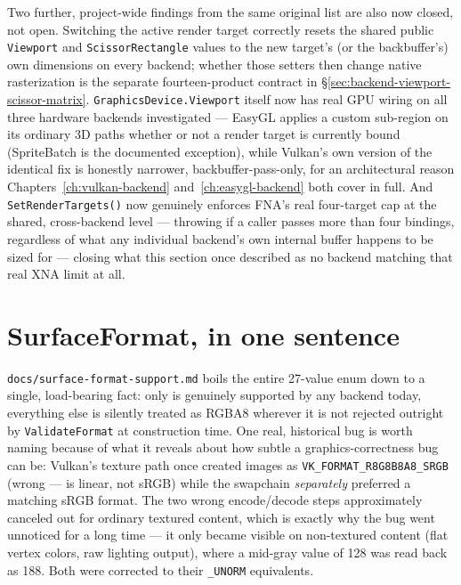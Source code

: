 Two further, project-wide findings from the same original list are also now closed, not open.
Switching the active render target correctly resets the shared public \texttt{Viewport} and
\texttt{Scissor\allowbreak{}Rectangle} values to the new target's (or the backbuffer's) own
dimensions on every backend; whether those setters then change native rasterization is the separate
fourteen-product contract in \S\ref{sec:backend-viewport-scissor-matrix}.
\texttt{GraphicsDevice.Viewport} itself now has real GPU wiring on all three
hardware backends investigated --- EasyGL applies a custom sub-region 
on its ordinary 3D paths whether or not a render target is currently bound (SpriteBatch is the
documented exception), while Vulkan's own version
of the identical fix is honestly narrower, backbuffer-pass-only, for an architectural reason
Chapters~\ref{ch:vulkan-backend} and~\ref{ch:easygl-backend} both cover in full. And
\texttt{SetRenderTargets()} now genuinely enforces FNA's real four-target cap at the shared,
cross-backend level --- throwing if a caller passes more than four bindings, regardless of
what any individual backend's own internal buffer happens to be sized for --- closing what
this section once described as no backend matching that real XNA limit at all.

\section{SurfaceFormat, in one sentence}

\texttt{docs/surface-format-support.md} boils the entire 27-value 
enum down to a single, load-bearing fact: only  is genuinely
supported by any backend today, everything else is silently treated as RGBA8 wherever it is
not rejected outright by \texttt{ValidateFormat} at construction time. One real, historical
bug is worth naming because of what it reveals about how subtle a graphics-correctness bug
can be: Vulkan's texture path once created images as \texttt{VK\_FORMAT\_R8G8B8A8\_SRGB}
(wrong ---  is linear, not sRGB) while the swapchain
\emph{separately} preferred a matching sRGB format. The two wrong encode/decode steps
approximately canceled out for ordinary textured content, which is exactly why the bug went
unnoticed for a long time --- it only became visible on non-textured content (flat vertex
colors, raw lighting output), where a mid-gray value of 128 was read back as 188. Both were
corrected to their \texttt{\_UNORM} equivalents.

